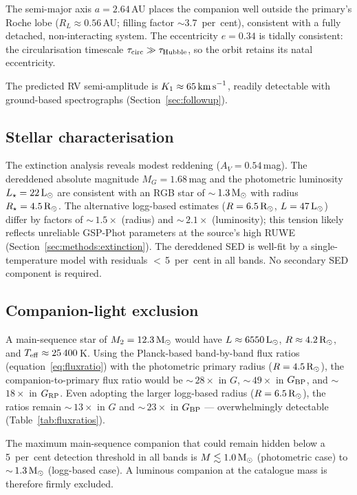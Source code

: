 \documentclass[usenatbib,fleqn]{mnras}
\newcommand{\Msun}{{\rm M}_\odot}
\newcommand{\Lsun}{{\rm L}_\odot}
\newcommand{\Rsun}{{\rm R}_\odot}
\newcommand{\kms}{{\rm km\,s}^{-1}}
\begin{document}
The semi-major axis $a = 2.64$\,AU places the companion well
outside the primary's Roche lobe ($R_L \approx 0.56$\,AU; filling
factor $\sim$3.7~per~cent), consistent with a fully detached,
non-interacting system.  The eccentricity $e = 0.34$ is
tidally consistent: the circularisation timescale
$\tau_{\rm circ} \gg \tau_{\rm Hubble}$, so the orbit retains its
natal eccentricity.

The predicted RV semi-amplitude is $K_1 \approx 65\,\kms$,
readily detectable with ground-based spectrographs
(Section~\ref{sec:followup}).

\subsection{Stellar characterisation}
\label{sec:results:stellar}

The extinction analysis reveals modest reddening
($A_V = 0.54$\,mag).  The dereddened absolute magnitude
$M_G = 1.68$\,mag and the photometric luminosity
$L_\star = 22\,\Lsun$ are consistent with an RGB star of
$\sim$\,$1.3\,\Msun$ with radius $R_\star = 4.5\,\Rsun$.
The alternative logg-based estimates ($R = 6.5\,\Rsun$,
$L = 47\,\Lsun$) differ by factors of $\sim$\,$1.5\times$
(radius) and $\sim$\,$2.1\times$ (luminosity); this tension
likely reflects unreliable GSP-Phot parameters at the source's
high RUWE (Section~\ref{sec:methods:extinction}).  The dereddened
SED is well-fit by a single-temperature model with residuals
$<$\,5~per~cent in all bands.  No secondary SED component is
required.

\subsection{Companion-light exclusion}
\label{sec:results:companion}

A main-sequence star of $M_2 = 12.3\,\Msun$ would have
$L \approx 6550\,\Lsun$, $R \approx 4.2\,\Rsun$, and
$T_{\rm eff} \approx 25\,400$\,K.  Using the Planck-based
band-by-band flux ratios (equation~\ref{eq:fluxratio}) with the
photometric primary radius ($R = 4.5\,\Rsun$), the
companion-to-primary flux ratio would be $\sim$\,$28\times$ in $G$,
$\sim$\,$49\times$ in $G_{\rm BP}$, and $\sim$\,$18\times$ in
$G_{\rm RP}$.  Even adopting the larger logg-based radius
($R = 6.5\,\Rsun$), the ratios remain $\sim$\,$13\times$ in $G$
and $\sim$\,$23\times$ in $G_{\rm BP}$ --- overwhelmingly
detectable (Table~\ref{tab:fluxratios}).

The maximum main-sequence companion that could remain hidden below
a 5~per~cent detection threshold in all bands is
$M \lesssim 1.0\,\Msun$ (photometric case) to
$\sim$\,$1.3\,\Msun$ (logg-based case).  A luminous companion
at the catalogue mass is therefore firmly excluded.
\end{document}
